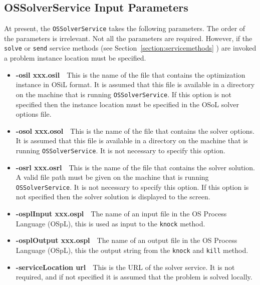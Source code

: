 \documentclass[11pt]{article}
\renewcommand{\_}{{\char"5F}}
\renewcommand{\{}{{\char"7B}}
\renewcommand{\}}{{\char"7D}}
\renewcommand{\^}{{\char"0D}}
\renewcommand{\'}{{\char"0D}}
\begin{document}
\begin{enumerate}[Step 1:]
\subsection{OSSolverService Input Parameters}

At present, the {\tt OSSolverService} takes the following parameters. The order of the parameters is irrelevant.
Not all the parameters are required. However, if the {\tt solve} or {\tt send}%
 service    methods  (see Section~\ref{section:servicemethods} ) are invoked
a problem instance location must be specified.

\begin{itemize}

\item[] {\bf -osil xxx.osil}\ \ This is the name of the file that contains the optimization instance in
OSiL  format. It is assumed that this file is available in a directory on the
machine that is running {\tt OSSolverService}.
If this option is not specified then the instance location must be specified in the OSoL solver options file.

\item[] {\bf -osol xxx.osol}\ \ This is the name of the file that contains the solver options. It is assumed that
this file is available in a directory on the machine that is running {\tt OSSolverService}. It is not necessary to
specify this option.

\item[] {\bf -osrl xxx.osrl}\ \ This is the name of the file that contains the solver solution. A valid file path
must be given on the machine that is running {\tt OSSolverService}. It is not necessary to specify this option.
If this option is not specified then the solver solution is displayed to the screen.


\item[] {\bf -osplInput xxx.ospl}\ \  The name of an input file in the  OS Process Language (OSpL), this is used as input  to the {\tt knock} method.

\item[] {\bf -osplOutput xxx.ospl}\ \  The name of an output file in the  OS Process Language (OSpL), this the  output  string from the {\tt knock}  and {\tt kill} method.

\item[] {\bf -serviceLocation url}\ \ This is the URL of the solver service. It is not required, and if not specified it is assumed that the problem is solved locally.


\end{itemize}
\end{enumerate}
\end{document}
